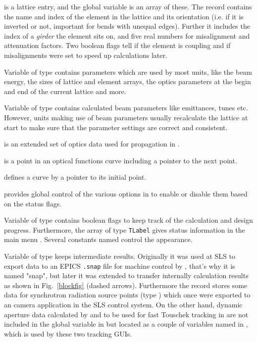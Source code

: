 \documentclass[12pt]{article}
\newcommand\code[1]{{\tt #1}}
\newcommand{\unico}[1]{{\color{burntorange}\code{#1}}}
\newcommand{\opagui}[1]{\colorbox{blue!20}{{\color{black}\code{#1}}}}
\newcommand{\ogui}[1]{\hyperref[#1]{\opagui{#1}}}
\newcommand{\opauni}[1]{\colorbox{orange!30}{{\color{black}\code{#1}}}}
\newcommand{\ouni}[1]{\hyperref[#1]{\opauni{#1}}}
\begin{document}
\unico{LatticeType} is a lattice entry, and the global variable \unico{Lattice} is an array of these. The record contains the name and index of the element in the lattice and its orientation (i.e. if it is inverted or not, important for bends with unequal edges). Further it includes the index of a {\em girder} the element sits on, and five real numbers for misalignment and attenuation factors. Two boolean flags tell if the element is coupling and if misalignments were set to speed up calculations later. 

Variable \unico{Glob} of type \unico{GlobType} contains parameters which are used by most units, like the beam energy, the sizes of lattice and element arrays, the optics parameters at the begin and end of the current lattice and more. 

Variable \unico{Beam} of type \unico{BeamParType} contains calculated beam parameters like emittances, tunes etc. However, units making use of beam parameters usually recalculate the lattice at start to make sure that the parameter settings are correct and consistent.

\unico{OpValType} is an extended set of optics data used for propagation in \ouni{elemlib}.

\unico{CurveType} is a point in an optical functions curve including a pointer to the next point.

\unico{CurvePlotType} defines a curve by a pointer to its initial point.

\unico{MainButtonHandles} provides global control of the various options in \ogui{opamenu} to enable or disable them based on the status flags.

Variable \unico{Status} of type \unico{StatusType} contains boolean flags to keep track of the calculation and design progress. 
Furthermore, the array \unico{StatusLabels} of type \code{TLabel} gives status information in the main menu \ogui{opamenu}. Several constants named \unico{Status\dots} control the appearance.

Variable \unico{SnapSave} of type \unico{SnapSaveType} keeps intermediate results.  Originally it was used at SLS to export data to an EPICS \code{.snap} file for machine control by \ogui{opacurrents}, that's why it is named "snap", but later it was extended to transfer internally calculation results as shown in Fig.~\ref{blockfig} (dashed arrows). 
Furthermore the record stores some data for synchrotron radiation source points (type \unico{XB\_SnapSaveType}) which once were exported to an camera application in the SLS control system. 
On the other hand, dynamic aperture data calculated by \ogui{opatrackda} and to be used for fast Touschek tracking in \ogui{opatracktt} are not included in the global \unico{SnapSave} variable in \unico{globlib} but located as a couple of variables named \unico{Flo\dots} in \unico{tracklib}, which is used by these two tracking GUIs.
\end{document}
